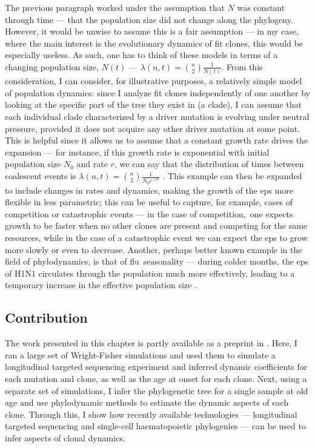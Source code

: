 The previous paragraph worked under the assumption that $N$ was constant through time --- that the population size did not change along the phylogeny. However, it would be unwise to assume this is a fair assumption --- in my case, where the main interest is the evolutionary dynamics of fit clones, this would be especially useless. As such, one has to think of these models in terms of a changing population size, $N(t)$ --- $\lambda(n,t) = \binom{n}{2}\frac{1}{N(t)}$. From this consideration, I can consider, for illustrative purposes, a relatively simple model of population dynamics: since I analyze fit clones independently of one another by looking at the specific part of the tree they exist in (a clade), I can assume that each individual clade characterized by a driver mutation is evolving under neutral pressure, provided it does not acquire any other driver mutation at some point. This is helpful since it allows us to assume that a constant growth rate drives the expansion --- for instance, if this growth rate is exponential with initial population size $N_0$ and rate $r$, we can say that the distribution of times between coalescent events is $\lambda(n,t) = \binom{n}{2}\frac{1}{N_0 e^{-rt}}$ \cite{Volz2013-ey}. This example can then be expanded to include changes in rates and dynamics, making the growth of the \ac{eps} more flexible in less parametric; this can be useful to capture, for example, cases of competition or catastrophic events --- in the case of competition, one expects growth to be faster when no other clones are present and competing for the same resources, while in the case of a catastrophic event we can expect the \ac{eps} to grow more slowly or even to decrease. Another, perhaps better known example in the field of phylodynamics, is that of flu seasonality --- during colder months, the \ac{eps} of H1N1 circulates through the population much more effectively, leading to a temporary increase in the effective population size \cite{Karcher2020-bg}. 

\subsection{Contribution}

The work presented in this chapter is partly available as a preprint in \cite{Fabre2021-uw}. Here, I ran a large set of Wright-Fisher simulations and used them to simulate a longitudinal targeted sequencing experiment and inferred dynamic coefficients for each mutation and clone, as well as the age at onset for each clone. Next, using a separate set of simulations, I infer the phylogenetic tree for a single sample at old age and use phylodynamic methods to estimate the dynamic aspects of each clone. Through this, I show how recently available technologies --- longitudinal targeted sequencing and single-cell haematopoietic phylogenies --- can be used to infer aspects of clonal dynamics.

